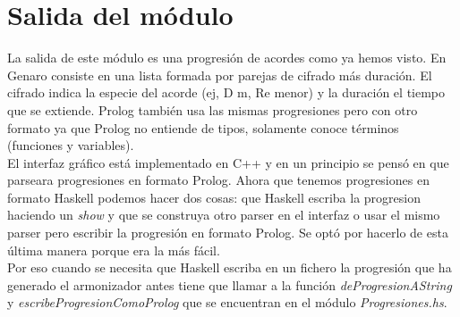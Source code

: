 \normalsize

\section{Salida del m\'odulo}
La salida de este m\'odulo es una progresi\'on de acordes como ya hemos visto.
En Genaro consiste en una lista formada por parejas de cifrado m\'as
duraci\'on. El cifrado indica la especie del acorde (ej, D m, Re menor)
y la duraci\'on el tiempo que se extiende. Prolog tambi\'en usa las mismas
progresiones pero con otro formato ya que Prolog no entiende de tipos,
solamente conoce t\'erminos (funciones y variables).\\
\indent El interfaz gr\'afico
est\'a implementado en C++ y en un principio se pens\'o en que parseara
progresiones en formato Prolog. Ahora que tenemos progresiones en formato
Haskell podemos hacer dos cosas: que Haskell escriba la progresion haciendo
un \emph{show} y que se construya otro parser en el interfaz o usar el mismo
parser pero escribir la progresi\'on en formato Prolog. Se opt\'o por hacerlo
de esta \'ultima manera porque era la m\'as f\'acil.\\
\indent Por eso cuando se necesita que Haskell escriba en un fichero la progresi\'on
que ha generado el armonizador antes tiene que llamar a la funci\'on 
\emph{deProgresionAString} y \emph{escribeProgresionComoProlog} que se encuentran
en el m\'odulo \emph{Progresiones.hs}.
